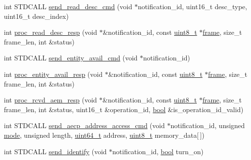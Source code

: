 \begin{DoxyCompactItemize}
\item 
int S\+T\+D\+C\+A\+LL \hyperlink{classavdecc__lib_1_1end__station__imp_a01c647108f75d8f24fb5d2d5aad031ac}{send\+\_\+read\+\_\+desc\+\_\+cmd} (void $\ast$notification\+\_\+id, uint16\+\_\+t desc\+\_\+type, uint16\+\_\+t desc\+\_\+index)
\item 
int \hyperlink{classavdecc__lib_1_1end__station__imp_aec709f7fbab1e54a17c113219c690f5f}{proc\+\_\+read\+\_\+desc\+\_\+resp} (void $\ast$\&notification\+\_\+id, const \hyperlink{stdint_8h_aba7bc1797add20fe3efdf37ced1182c5}{uint8\+\_\+t} $\ast$\hyperlink{gst__avb__playbin_8c_ac8e710e0b5e994c0545d75d69868c6f0}{frame}, size\+\_\+t frame\+\_\+len, int \&status)
\item 
int S\+T\+D\+C\+A\+LL \hyperlink{classavdecc__lib_1_1end__station__imp_a8abc3c53422ce4058bd73932e7e1bb40}{send\+\_\+entity\+\_\+avail\+\_\+cmd} (void $\ast$notification\+\_\+id)
\item 
int \hyperlink{classavdecc__lib_1_1end__station__imp_aac9243417afd8dbcfb91d061128d5aec}{proc\+\_\+entity\+\_\+avail\+\_\+resp} (void $\ast$\&notification\+\_\+id, const \hyperlink{stdint_8h_aba7bc1797add20fe3efdf37ced1182c5}{uint8\+\_\+t} $\ast$\hyperlink{gst__avb__playbin_8c_ac8e710e0b5e994c0545d75d69868c6f0}{frame}, size\+\_\+t frame\+\_\+len, int \&status)
\item 
int \hyperlink{classavdecc__lib_1_1end__station__imp_a8b24d9b5507eefd727584df0076704a5}{proc\+\_\+rcvd\+\_\+aem\+\_\+resp} (void $\ast$\&notification\+\_\+id, const \hyperlink{stdint_8h_aba7bc1797add20fe3efdf37ced1182c5}{uint8\+\_\+t} $\ast$\hyperlink{gst__avb__playbin_8c_ac8e710e0b5e994c0545d75d69868c6f0}{frame}, size\+\_\+t frame\+\_\+len, int \&status, uint16\+\_\+t \&operation\+\_\+id, \hyperlink{avb__gptp_8h_af6a258d8f3ee5206d682d799316314b1}{bool} \&is\+\_\+operation\+\_\+id\+\_\+valid)
\item 
int S\+T\+D\+C\+A\+LL \hyperlink{classavdecc__lib_1_1end__station__imp_a56f03efde2e3ff66697a2eb6bf42b143}{send\+\_\+aecp\+\_\+address\+\_\+access\+\_\+cmd} (void $\ast$notification\+\_\+id, unsigned \hyperlink{rawsock__tx_8c_a1ea5d0cb93f22f7d0fdf804bd68c3326}{mode}, unsigned length, \hyperlink{parse_8c_aec6fcb673ff035718c238c8c9d544c47}{uint64\+\_\+t} address, \hyperlink{stdint_8h_aba7bc1797add20fe3efdf37ced1182c5}{uint8\+\_\+t} memory\+\_\+data\mbox{[}$\,$\mbox{]})
\item 
int S\+T\+D\+C\+A\+LL \hyperlink{classavdecc__lib_1_1end__station__imp_ac883ded415f13432641110003a79270b}{send\+\_\+identify} (void $\ast$notification\+\_\+id, \hyperlink{avb__gptp_8h_af6a258d8f3ee5206d682d799316314b1}{bool} turn\+\_\+on)

\end{DoxyCompactItemize}
